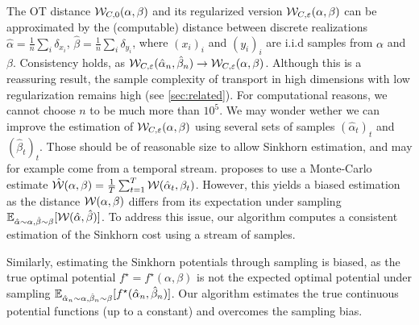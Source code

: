 The OT distance $\mathcal{W}_{C,0}(\alpha,\beta)$ and its regularized version
$\mathcal{W}_{C,\varepsilon}(\alpha,\beta)$ can be approximated by the (computable)
distance between discrete realizations $\hat \alpha = \frac{1}{n} \sum_i
\delta_{x_i}$, $\hat \beta = \frac{1}{n} \sum_i \delta_{y_i}$, where ${(x_i)}_i$
and ${(y_i)}_i$ are i.i.d samples from $\alpha$ and $\beta$.  Consistency holds,
as $\mathcal{W}_{C,\varepsilon}(\hat \alpha_n, \hat \beta_n) \to \mathcal{W}_{C,\varepsilon}(\alpha,
\beta)$. Although this is a reassuring result, the sample complexity of
transport in high dimensions with low regularization remains high (see
\autoref{sec:related}). For computational reasons, we cannot choose $n$ to be
much more than $10^5$. We may wonder wether we can improve the estimation of
$\mathcal{W}_{C,\varepsilon}(\alpha,\beta)$ using several sets of samples $(\hat
\alpha_t)_t$ and ${(\hat \beta_t)}_t$. Those should be of reasonable size to
allow Sinkhorn estimation, and may for example come from a temporal stream.
\citet{2018-Genevay-aistats} proposes to use a Monte-Carlo estimate $\hat
{\mathcal{W}}(\alpha, \beta) = \frac{1}{T} \sum_{t=1}^T \mathcal{W}(\hat \alpha_t, \beta_t)$.
However, this yields a biased estimation as the distance $\mathcal{W}(\alpha,
\beta)$ differs from its expectation under sampling $\mathbb{E}_{\hat \alpha \sim
\alpha, \hat \beta \sim \beta} [\mathcal{W}(\hat \alpha, \hat \beta)]$. To address this
issue, our algorithm computes a consistent estimation of the Sinkhorn cost
using a stream of samples.

Similarly, estimating the Sinkhorn potentials through sampling is biased, as
the true optimal potential $f^\star=f^\star(\alpha, \beta)$ is not the expected
optimal potential under sampling $\mathbb{E}_{\hat \alpha_n \sim \alpha, \hat \beta_n
\sim \beta}[f^\star(\hat \alpha_n, \hat \beta_n)]$. Our algorithm estimates the
true continuous potential functions (up to a constant) and overcomes the sampling
bias.



